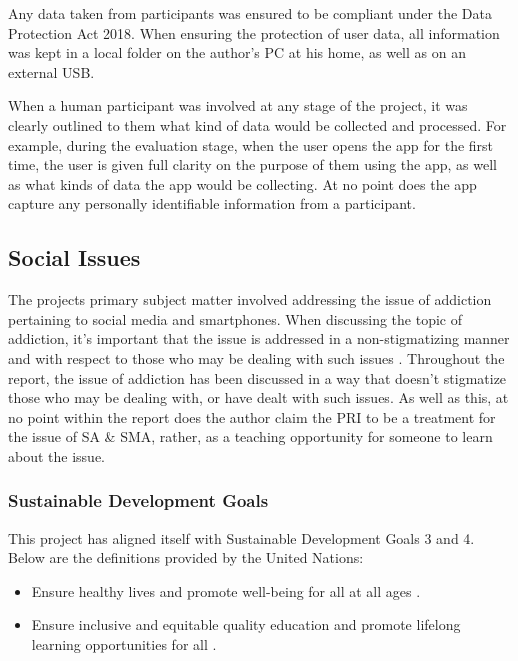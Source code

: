 \documentclass[12pt]{article}
\begin{document}
Any data taken from participants was ensured to be compliant under the Data Protection Act 2018. When ensuring the protection of 
user data, all information was kept in a local folder on the author's PC at his home, as well as on an external USB.\newline

When a human participant was involved at any stage of the project, it was clearly outlined to them what kind of data would be collected and
processed. For example, during the evaluation stage, when the user opens the app for the first time, the user is given full clarity on the
purpose of them using the app, as well as what kinds of data the app would be collecting. At no point does the app capture any personally
identifiable information from a participant.

\subsection{Social Issues}
The projects primary subject matter involved addressing the issue of addiction pertaining to social media and smartphones. When discussing
the topic of addiction, it's important that the issue is addressed in a non-stigmatizing manner and with respect to those who may be dealing
with such issues \autocite{nida-addiction, camh-writing-addiction}. Throughout the report, the issue of addiction has been discussed in a way that
doesn't stigmatize those who may be dealing with, or have dealt with such issues. As well as this, at no point within the report does the author 
claim the PRI to be a treatment for the issue of SA \& SMA, rather, as a teaching opportunity for someone to learn about the issue.

\subsubsection{Sustainable Development Goals}
This project has aligned itself with Sustainable Development Goals 3 and 4. Below are the definitions provided by the United Nations:

\begin{itemize}
	\item Ensure healthy lives and promote well-being for all at all ages \autocite{un-sdg-3}.
	\item Ensure inclusive and equitable quality education and promote lifelong learning opportunities for all \autocite{un-sdg-4}.
\end{itemize}
\end{document}
